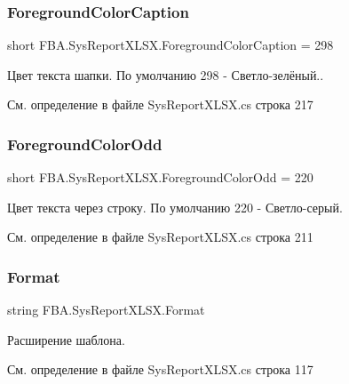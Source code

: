 \subsubsection{\texorpdfstring{Foreground\+Color\+Caption}{ForegroundColorCaption}}
{\footnotesize\ttfamily short F\+B\+A.\+Sys\+Report\+X\+L\+S\+X.\+Foreground\+Color\+Caption = 298}



Цвет текста шапки. По умолчанию 298 -\/ Светло-\/зелёный.. 



См. определение в файле Sys\+Report\+X\+L\+S\+X.\+cs строка 217

\mbox{\label{class_f_b_a_1_1_sys_report_x_l_s_x_ab01e0cb21ac9395db05aff5aa8a73b78}} 
\subsubsection{\texorpdfstring{Foreground\+Color\+Odd}{ForegroundColorOdd}}
{\footnotesize\ttfamily short F\+B\+A.\+Sys\+Report\+X\+L\+S\+X.\+Foreground\+Color\+Odd = 220}



Цвет текста через строку. По умолчанию 220 -\/ Светло-\/серый. 



См. определение в файле Sys\+Report\+X\+L\+S\+X.\+cs строка 211

\mbox{\label{class_f_b_a_1_1_sys_report_x_l_s_x_ad8ee59c7792fac71f00b613684e26c99}} 
\subsubsection{\texorpdfstring{Format}{Format}}
{\footnotesize\ttfamily string F\+B\+A.\+Sys\+Report\+X\+L\+S\+X.\+Format}



Расширение шаблона. 



См. определение в файле Sys\+Report\+X\+L\+S\+X.\+cs строка 117

